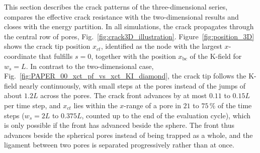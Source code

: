 \documentclass[pdflatex,sn-mathphys-num]{sn-jnl}%
\theoremstyle{thmstyleone}%
\theoremstyle{thmstyletwo}%
\theoremstyle{thmstylethree}%
\begin{document}
This section describes the crack patterns of the three-dimensional series, compares the effective crack resistance with the two-dimensional results and closes with the energy partition. In all simulations, the crack propagates through the central row of pores, Fig.~\ref{fig:crack3D_illustration}. Figure~\ref{fig:position_3D} shows the crack tip position $x_{ct}$, identified as the node with the largest $x$-coordinate that fulfills $s=0$, together with the position $x_{\text{bc}}$ of the K-field for $w_s = L$. In contrast to the two-dimensional case, Fig.~\ref{fig:PAPER_00_xct_pf_vs_xct_KI_diamond}, the crack tip follows the K-field nearly continuously, with small steps at the pores instead of the jumps of about $1.2L$ across the pores. The crack front advances by at most $0.11$ to $0.15L$ per time step, and $x_{ct}$ lies within the $x$-range of a pore in $21$ to $75\,\%$ of the time steps ($w_s = 2L$ to $0.375L$, counted up to the end of the evaluation cycle), which is only possible if the front has advanced beside the sphere. The front thus advances beside the spherical pores instead of being trapped as a whole, and the ligament between two pores is separated progressively rather than at once.
\end{document}
